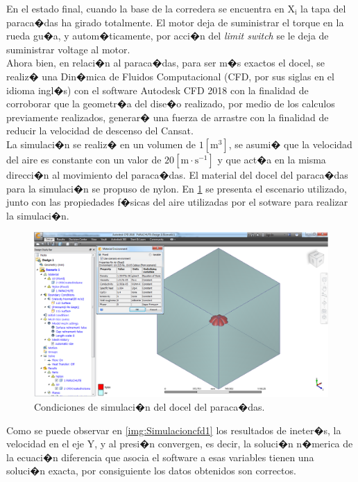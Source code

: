 \documentclass[10pt,a4paper]{book}
\begin{document}
En el estado final, cuando la base de la corredera se encuentra en $\text{X}_{\text{i}}$ la tapa del paraca�das ha girado totalmente. El motor deja de suministrar el torque en la rueda gu�a, y autom�ticamente, por acci�n del \textit{limit switch} se le deja de suministrar voltage al motor.\\

Ahora bien, en relaci�n al paraca�das, para ser m�s exactos el docel, se realiz� una Din�mica de Fluidos Computacional (CFD, por sus siglas en el idioma ingl�s) con el software Autodesk CFD 2018 \textregistered con la finalidad de corroborar que la geometr�a del dise�o realizado, por medio de los calculos previamente realizados, generar� una fuerza de arrastre con la finalidad de reducir la velocidad de descenso del Cansat.\\
La simulaci�n se realiz� en un volumen de $1 \left[ \text{m}^{3} \right]$, se asumi� que la velocidad del aire es constante con un valor de $20 \left[ \text{m} \cdot \text{s}^{-1}\right]$ y que act�a en la misma direcci�n al movimiento del paraca�das. El material del docel del paraca�das para la simulaci�n se propuso de nylon. En \ref{img:Simulacioncfdcero} se presenta el escenario utilizado, junto con las propiedades f�sicas del aire utilizadas por el sotware para realizar la simulaci�n. 

\begin{figure}[H]
\begin{center}
\includegraphics[scale=0.40]{Imagenes/Simulacioncfd0.png}
\caption{Condiciones de simulaci�n del docel del paraca�das. \label{img:Simulacioncfdcero}}
\end{center}
\end{figure} 
 
 Como se puede observar en \ref{img:Simulacioncfd1} los resultados de ineter�s, la velocidad en el  eje Y, y al presi�n convergen, es decir, la soluci�n n�merica de la ecuaci�n diferencia que asocia el software a esas variables tienen una soluci�n exacta, por consiguiente los datos obtenidos son correctos.
\end{document}
